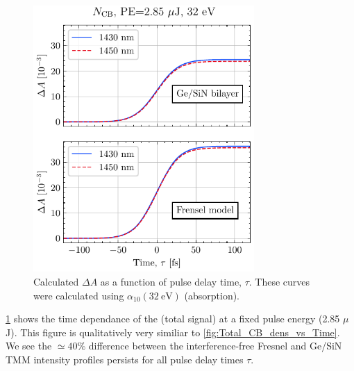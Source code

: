 \begin{figure}
	\centering
	\includegraphics[width=0.75\textwidth]{figures/chap4/FVA_Total_CB_dens_vs_T.pdf}
	\caption{Calculated $\Delta A$ as a function of pulse delay time, $\tau$. These curves were calculated using $\alpha_{10}(32 \ \textrm{eV})$ (absorption).}
	\label{fig:FVA_Total_CB_dens_vs_T}
\end{figure}

\cref{fig:FVA_Total_CB_dens_vs_T} shows the time dependance of the (total signal) at a fixed pulse energy (2.85 $\mu$J). This figure is qualitatively very similiar to \cref{fig:Total_CB_dens_vs_Time}. We see the $\simeq 40\%$ difference between the interference-free Fresnel and Ge/SiN TMM intensity profiles persists for all pulse delay times $\tau$.


